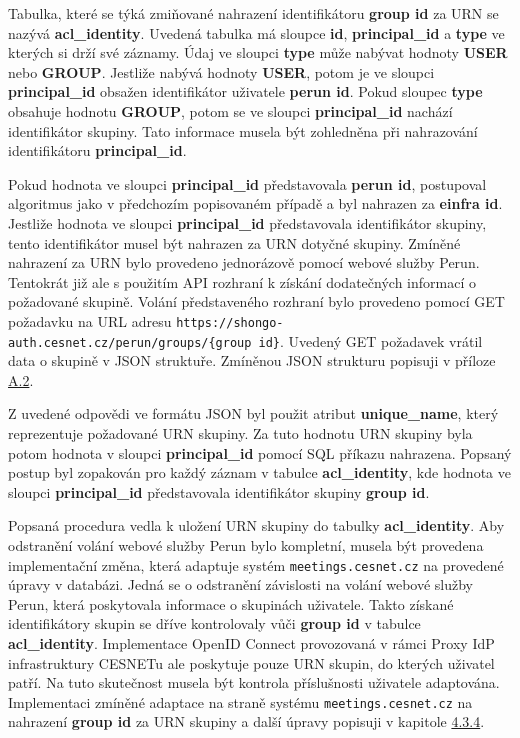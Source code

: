 \documentclass[
  printed, %
  twoside, %
  table,   %
  nolof,     %
  nolot,     %
]{fithesis3}
\begin{document}
\par 

Tabulka, které se týká zmiňované nahrazení identifikátoru \textbf{group id} za URN se nazývá \textbf{acl\_identity}. Uvedená tabulka má sloupce \textbf{id}, \textbf{principal\_id} a \textbf{type} ve kterých si drží své záznamy. Údaj ve sloupci \textbf{type} může nabývat hodnoty \textbf{USER} nebo \textbf{GROUP}. Jestliže nabývá hodnoty \textbf{USER}, potom je ve sloupci \textbf{principal\_id} obsažen identifikátor uživatele \textbf{perun id}. Pokud sloupec \textbf{type} obsahuje hodnotu \textbf{GROUP}, potom se ve sloupci \textbf{principal\_id} nachází identifikátor skupiny. Tato informace musela být zohledněna při nahrazování identifikátoru \textbf{principal\_id}. 

\par 
Pokud hodnota ve sloupci \textbf{principal\_id} představovala \textbf{perun id}, postupoval algoritmus jako v předchozím popisovaném případě a byl nahrazen za \textbf{einfra id}. Jestliže hodnota ve sloupci \textbf{principal\_id} představovala identifikátor skupiny, tento identifikátor musel být nahrazen za URN  dotyčné skupiny. Zmíněné nahrazení za URN bylo provedeno jednorázově pomocí webové služby Perun. Tentokrát již ale s použitím API rozhraní k získání dodatečných informací o požadované skupině. Volání představeného rozhraní bylo provedeno pomocí GET požadavku na URL adresu  \texttt{https://shongo-auth.cesnet.cz/perun/groups/\{group id\}}. Uvedený GET požadavek vrátil data o skupině v JSON struktuře. Zmíněnou JSON strukturu popisuji v příloze \hyperref[table:perunws:group]{A.2}.
\par
Z uvedené odpovědi ve formátu JSON byl použit atribut \textbf{unique\_name}, který reprezentuje požadované URN skupiny. Za tuto hodnotu URN skupiny byla potom hodnota v sloupci \textbf{principal\_id} pomocí SQL příkazu nahrazena. Popsaný postup byl zopakován pro každý záznam v tabulce \textbf{acl\_identity}, kde hodnota ve sloupci \textbf{principal\_id} představovala identifikátor skupiny \textbf{group id}. 
\par 

Popsaná procedura vedla k uložení URN skupiny do tabulky \textbf{acl\_identity}. Aby odstranění volání webové služby Perun bylo kompletní, musela být provedena implementační změna, která adaptuje systém \texttt{meetings.cesnet.cz} na provedené úpravy v databázi. Jedná se o odstranění závislosti na volání webové služby Perun, která poskytovala informace o skupinách uživatele. Takto získané identifikátory skupin se dříve kontrolovaly vůči \textbf{group id} v tabulce \textbf{acl\_identity}. Implementace OpenID Connect provozovaná v rámci Proxy IdP infrastruktury CESNETu ale poskytuje pouze URN skupin, do kterých uživatel patří. Na tuto skutečnost musela být kontrola příslušnosti uživatele adaptována. Implementaci zmíněné adaptace na straně systému \texttt{meetings.cesnet.cz} na nahrazení \textbf{group id} za URN skupiny a další úpravy popisuji v kapitole \hyperref[ShongoImpl-web]{4.3.4}. 
\end{document}
